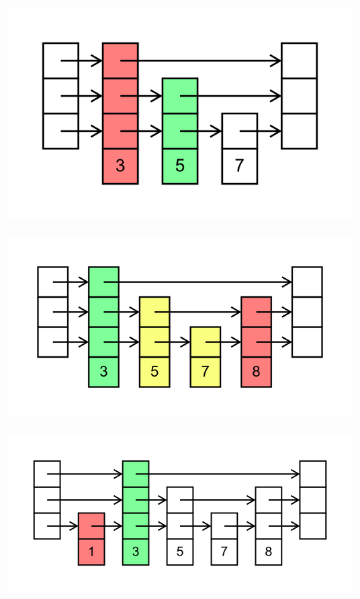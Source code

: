 \documentclass[11pt,a4paper]{article}
\begin{document}
\begin{loesung}
\begin{enumerate}
\begin{figure}[h!]
\begin{subfigure}[b]{0.3\textwidth}
                \centering
                \includegraphics[scale=0.15]{img/2a/3}
            \end{subfigure}
        \end{figure}
        \begin{figure}[h!]
            \centering
            \begin{subfigure}[b]{0.45\textwidth}
                \centering
                \includegraphics[scale=0.15]{img/2a/4}
            \end{subfigure}
            \begin{subfigure}[b]{0.45\textwidth}
                \centering
                \includegraphics[scale=0.15]{img/2a/5}

\end{subfigure}
\end{figure}
\end{enumerate}
\end{loesung}
\end{document}
